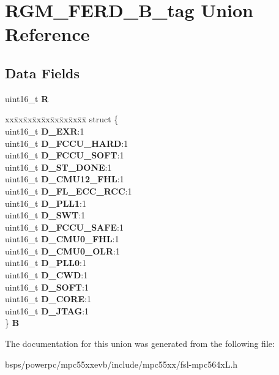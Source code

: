 \hypertarget{unionRGM__FERD__16B__tag}{}\section{R\+G\+M\+\_\+\+F\+E\+R\+D\+\_\+B\+\_\+tag Union Reference}
\label{unionRGM__FERD__16B__tag}
\subsection*{Data Fields}
\begin{DoxyCompactItemize}
\item 
\mbox{\label{unionRGM__FERD__16B__tag_a380ec6a52d29ede3fbb1d846a3e6a75c}} 
uint16\+\_\+t {\bfseries R}
\item 
\mbox{\label{unionRGM__FERD__16B__tag_adfb998440a4903b07829ffc5db7672d0}} 
\begin{tabbing}
xx\=xx\=xx\=xx\=xx\=xx\=xx\=xx\=xx\=\kill
struct \{\\
\>uint16\_t {\bfseries D\_EXR}:1\\
\>uint16\_t {\bfseries D\_FCCU\_HARD}:1\\
\>uint16\_t {\bfseries D\_FCCU\_SOFT}:1\\
\>uint16\_t {\bfseries D\_ST\_DONE}:1\\
\>uint16\_t {\bfseries D\_CMU12\_FHL}:1\\
\>uint16\_t {\bfseries D\_FL\_ECC\_RCC}:1\\
\>uint16\_t {\bfseries D\_PLL1}:1\\
\>uint16\_t {\bfseries D\_SWT}:1\\
\>uint16\_t {\bfseries D\_FCCU\_SAFE}:1\\
\>uint16\_t {\bfseries D\_CMU0\_FHL}:1\\
\>uint16\_t {\bfseries D\_CMU0\_OLR}:1\\
\>uint16\_t {\bfseries D\_PLL0}:1\\
\>uint16\_t {\bfseries D\_CWD}:1\\
\>uint16\_t {\bfseries D\_SOFT}:1\\
\>uint16\_t {\bfseries D\_CORE}:1\\
\>uint16\_t {\bfseries D\_JTAG}:1\\
\} {\bfseries B}\\

\end{tabbing}\end{DoxyCompactItemize}


The documentation for this union was generated from the following file\+:\begin{DoxyCompactItemize}
\item 
bsps/powerpc/mpc55xxevb/include/mpc55xx/fsl-\/mpc564x\+L.\+h\end{DoxyCompactItemize}
